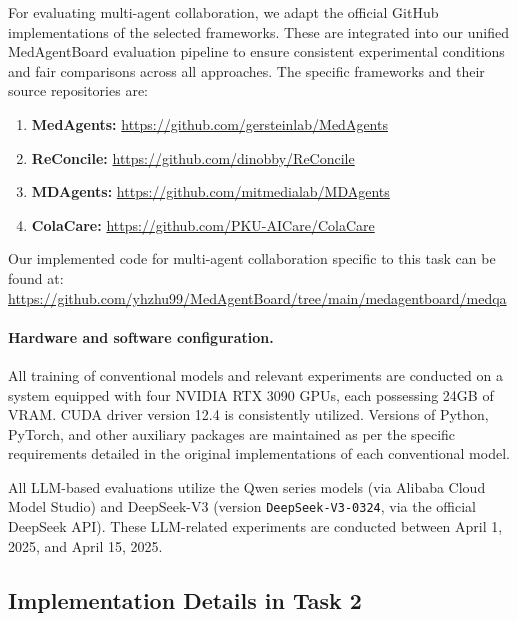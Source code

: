 \documentclass{article}
\begin{document}
For evaluating multi-agent collaboration, we adapt the official GitHub implementations of the selected frameworks. These are integrated into our unified MedAgentBoard evaluation pipeline to ensure consistent experimental conditions and fair comparisons across all approaches. The specific frameworks and their source repositories are:
\begin{enumerate}
    \item\textbf{MedAgents:} \url{https://github.com/gersteinlab/MedAgents}
    \item\textbf{ReConcile:} \url{https://github.com/dinobby/ReConcile}
    \item\textbf{MDAgents:} \url{https://github.com/mitmedialab/MDAgents}
    \item\textbf{ColaCare:} \url{https://github.com/PKU-AICare/ColaCare}
\end{enumerate}

Our implemented code for multi-agent collaboration specific to this task can be found at: \url{https://github.com/yhzhu99/MedAgentBoard/tree/main/medagentboard/medqa}

\paragraph{Hardware and software configuration.}
\label{sec:app_task1_hardware_software}

All training of conventional models and relevant experiments are conducted on a system equipped with four NVIDIA RTX 3090 GPUs, each possessing 24GB of VRAM. CUDA driver version 12.4 is consistently utilized. Versions of Python, PyTorch, and other auxiliary packages are maintained as per the specific requirements detailed in the original implementations of each conventional model.

All LLM-based evaluations utilize the Qwen series models (via Alibaba Cloud Model Studio) and DeepSeek-V3 (version \texttt{DeepSeek-V3-0324}, via the official DeepSeek API). These LLM-related experiments are conducted between April 1, 2025, and April 15, 2025.

\subsection{Implementation Details in Task 2}
\label{sec:app_task2_details}
\end{document}
